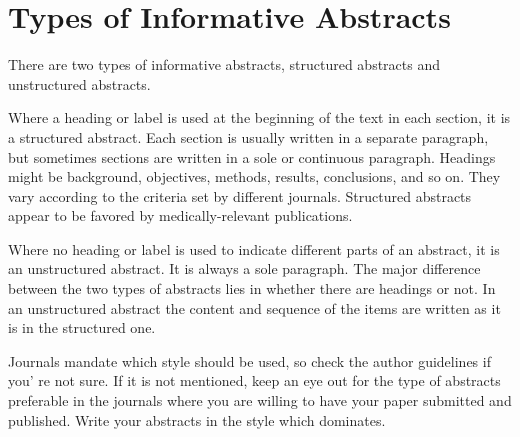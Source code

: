 \documentclass{ctexbook}
\begin{document}
\section{Types of Informative Abstracts}

There are two types of informative abstracts, structured abstracts and unstructured abstracts.

Where a heading or label is used at the beginning of the text in each section, it is a structured abstract. Each section is usually written in a separate paragraph, but sometimes sections are written in a sole or continuous paragraph. Headings might be background, objectives, methods, results, conclusions, and so on. They vary according to the criteria set by different journals. Structured abstracts appear to be favored by medically-relevant publications.

Where no heading or label is used to indicate different parts of an abstract, it is an unstructured abstract. It is always a sole paragraph. The major difference between the two types of abstracts lies in whether there are headings or not. In an unstructured abstract the content and sequence of the items are written as it is in the structured one.

Journals mandate which style should be used, so check the author guidelines if you' re not sure. If it is not mentioned, keep an eye out for the type of abstracts preferable in the journals where you are willing to have your paper submitted and published. Write your abstracts in the style which dominates.

\end{document}
